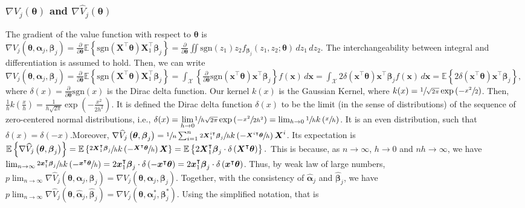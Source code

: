 \documentclass[12pt]{article}
\newcommand{\wh}{\widehat}
\newcommand{\itl}{\intercal}
\newcommand{\bs}{ \boldsymbol}
\newcommand{\mb}{\mathbb}
\newcommand{\ml}{\mathcal}
\newcommand{\txt}{\text}
\newcommand{\lt}{\left}
\newcommand{\rt}{\right}
\newcommand{\tsgn}{\txt{sgn}}
\begin{document}
\subsubsection{$\nabla V_j(\bs{\theta})$ and $\nabla\wh{V}_j(\bs{\theta})$}
The gradient of the value function with respect to $\bs{\theta}$ is \\
$\nabla V_j\lt(\bs{\theta}, \bs{\alpha}_j, \bs{\beta}_j\rt) = \frac{\partial}{\partial \bs{\theta}} \mb{E}\lt\{ \tsgn\lt(\bs{X}^{\itl}\bs{\theta}\rt)\bs{X}_1^{\itl}\bs{\beta}_j \rt\} =\frac{\partial}{\partial \bs{\theta}} \iint \tsgn\lt(z_1\rt)z_2 f_{\bs{\beta}_j}\lt(z_1, z_2; \bs{\theta}\rt) \,dz_1 \,dz_2$.
The interchangeability between integral and differentiation is assumed to hold. Then, we can write $\nabla V_j\lt(\bs{\theta}, \bs{\alpha}_j, \bs{\beta}_j\rt)
=\frac{\partial}{\partial \bs{\theta}} \mb{E}\lt\{ \tsgn\lt(\bs{X}^{\itl}\bs{\theta}\rt)\bs{X}_1^{\itl}\bs{\beta}_j \rt\} 
=  \int_{\bs{\ml{X}}}\lt\{\frac{\partial}{\partial \bs{\theta}} \tsgn\lt( \bs{x}^{\itl}\bs{\theta}\rt)\bs{x}^{\itl}\bs{\beta}_j\rt\}f(\bs{x})\,d\bs{x}
= \int_{\bs{\ml{X}}} 2\delta\lt( \bs{x}^{\itl}\bs{\theta} \rt)\bs{x}^{\itl}\bs{\beta}_j f(\bs{x})\,d\bs{x}
= \mb{E}\lt\{ 2\delta\lt( \bs{x}^{\itl}\bs{\theta} \rt)\bs{x}^{\itl}\bs{\beta}_j\rt\},$ 
where $\delta(x) = \frac{\partial}{\partial \bs{\theta}}\tsgn(x)$ is the Dirac delta function.
Our kernel $k(x)$ is the Gaussian Kernel, where $k(x) = \sfrac{1}{\sqrt{2\pi}} \exp\lt( - \sfrac{x^2}{2}\rt)$. Then, $\frac{1}{h}k\lt(\frac{x}{h}\rt) = \frac{1}{h\sqrt{2\pi}} \exp\lt( - \frac{x^2}{2h^2}\rt)$. It is defined the Dirac delta function $\delta(x)$ to be the limit (in the sense of distributions) of the sequence of zero-centered normal distributions, i.e., $\delta(x) = \underset{h \to 0}{\lim}\sfrac{1}{h\sqrt{2\pi}} \exp\lt(-\sfrac{x^2}{2h^2}\rt) = \lim_{h \to 0}\sfrac{1}{h}k\lt(\sfrac{x}{h}\rt)$. It is an even distribution, such that $\delta(x) = \delta(-x)$.Moreover, $\nabla\wh{V}_j\lt(\bs{\theta}, \bs{\beta}_j\rt)=  \sfrac{1}{n}\sum_{i=1}^{n}\sfrac{2\bs{X}_{1}^{i\itl}\bs{\beta}_{j}}{h}k\lt(-\sfrac{\bs{X}^{i\itl}\bs{\theta}}{h}\rt)\bs{X}^{i}$. Its expectation is $\mb{E}\lt\{ \nabla\wh{V}_j\lt(\bs{\theta}, \bs{\beta}_j\rt) \rt\}=  \mb{E}\lt\{ \sfrac{2\bs{X}_{1}^{\itl}\bs{\beta}_{j}}{h}k\lt(-\sfrac{\bs{X}^{\itl}\bs{\theta}}{h}\rt)\bs{X}\rt\} = \mb{E}\lt\{2\bs{X}_{1}^{\itl}\bs{\beta}_{j}\cdot\delta\lt(\bs{X}^{\itl}\bs{\theta}\rt)\rt\}.$ This is because, as $n\to \infty$, $h \to 0$  and $nh \to \infty$, we have $\lim_{n \to \infty} \sfrac{2\bs{x}_1^{\itl}\bs{\beta}_{j}}{h}k\lt(-\sfrac{\bs{x}^{\itl}\bs{\theta}}{h}\rt) = 2\bs{x}_{1}^{\itl}\bs{\beta}_{j}\cdot\delta\lt(-\bs{x}^{\itl}\bs{\theta}\rt)= 2\bs{x}_{1}^{\itl}\bs{\beta}_{j}\cdot\delta\lt(\bs{x}^{\itl}\bs{\theta}\rt)$. Thus, by weak law of large numbers, $p\lim_{n\to\infty}\nabla\wh{V}_j\lt(\bs{\theta}, \bs{\alpha}_j, \bs{\beta}_j\rt)=  \nabla V_j\lt(\bs{\theta}, \bs{\alpha}_j, \bs{\beta}_j\rt)$. Together, with the consistency of $\wh{\bs{\alpha}}_j$ and $\wh{\bs{\beta}}_j$, we have  $p\lim_{n\to\infty}\nabla\wh{V}_j\lt(\bs{\theta},\wh{\bs{\alpha}}_j, \wh{\bs{\beta}}_j\rt)=  \nabla V_j\lt(\bs{\theta}, \bs{\alpha}^*_j, \bs{\beta}^*_j\rt)$. Using the simplified notation, that is 
\end{document}
